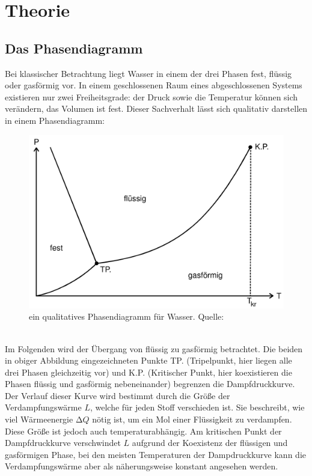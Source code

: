 \section{Theorie}
  \subsection{Das Phasendiagramm}
  \label{sec:phasendiagramm}
  Bei klassischer Betrachtung liegt Wasser in einem der drei Phasen fest, flüssig oder gasförmig vor. In einem geschlossenen Raum eines abgeschlossenen Systems existieren nur
  zwei Freiheitsgrade: der Druck sowie die Temperatur können sich verändern, das Volumen ist fest. Dieser Sachverhalt lässt sich qualitativ darstellen in einem Phasendiagramm:
  \\
  \begin{figure}
    \centering
    \label{fig:phasendiagramm}
      \includegraphics[scale = 0.2]{Content/phasendiagramm.png}
      \caption{ein qualitatives Phasendiagramm für Wasser. Quelle: \cite{AP01}}
  \end{figure}
  \\
  \noindent
  Im Folgenden wird der Übergang von flüssig zu gasförmig betrachtet. Die beiden in obiger Abbildung eingezeichneten Punkte TP.
  (Tripelpunkt, hier liegen alle drei Phasen gleichzeitig vor) und K.P. (Kritischer Punkt, hier koexistieren die Phasen flüssig
  und gasförmig nebeneinander)
  begrenzen die Dampfdruckkurve. Der Verlauf dieser Kurve wird bestimmt durch die Größe der Verdampfungswärme $L$, welche für
  jeden Stoff verschieden ist. Sie beschreibt,
  wie viel Wärmeenergie $\increment Q$ nötig ist, um ein Mol einer Flüssigkeit zu verdampfen. Diese Größe ist jedoch auch
  temperaturabhängig. Am kritischen Punkt der
  Dampfdruckkurve verschwindet $L$ aufgrund der Koexistenz der flüssigen und gasförmigen Phase, bei den meisten Temperaturen der
  Dampdruckkurve kann die Verdampfungswärme
  aber als näherungsweise konstant angesehen werden.
